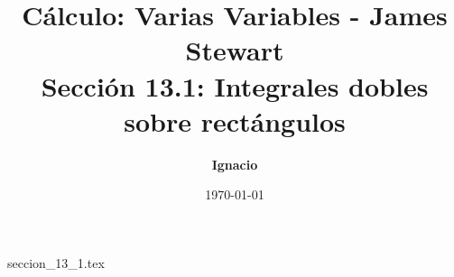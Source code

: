 \documentclass[11pt,spanish,oneside]{report}
\title{\textbf{Cálculo: Varias Variables - James Stewart} \\ \Large Sección 13.1: Integrales dobles sobre rectángulos}
\author{\textbf{Ignacio}}
\date{\today}
\begin{document}
\maketitle

{seccion_13_1.tex}
\end{document}

